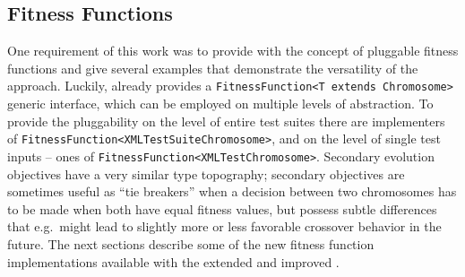\subsection{Fitness Functions}
\label{sec:fit}
One requirement of this work was to provide \xmlmate with the concept of pluggable fitness functions and 
give several examples that demonstrate the versatility of the approach. Luckily, \evosuite already provides 
a \texttt{FitnessFunction<T extends Chromosome>} generic interface, which can be employed on multiple 
levels of abstraction. To provide the pluggability on the level of  entire test suites there are implementers of
\texttt{FitnessFunction<XMLTestSuiteChromosome>}, and on the level of single test inputs -- ones of 
\texttt{FitnessFunction<XMLTestChromosome>}. 
Secondary evolution objectives have a very similar type topography; secondary objectives are sometimes useful 
as ``tie breakers'' when a decision between two chromosomes has to be made when both have equal fitness values,
but possess subtle differences that e.g.\ might lead to slightly more or less favorable crossover behavior in 
the future. The next sections describe some of the new fitness function implementations available with the 
extended and improved \xmlmate.
